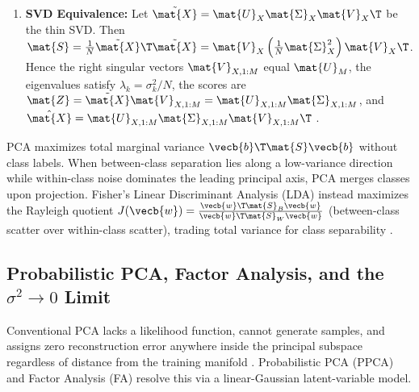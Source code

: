 \documentclass[../../../../master.tex]{subfiles}
\begin{document}
\begin{coremath}
\begin{enumerate}
  \item \textbf{SVD Equivalence:} Let $\tilde{\mat{X}} = \mat{U}_X \mat{\Sigma}_X \mat{V}_X\T$ be the thin SVD. Then $\mat{S} = \frac{1}{N}\tilde{\mat{X}}\T\tilde{\mat{X}} = \mat{V}_X \left(\frac{1}{N}\mat{\Sigma}_X^2\right) \mat{V}_X\T$. Hence the right singular vectors $\mat{V}_{X,1:M}$ equal $\mat{U}_M$, the eigenvalues satisfy $\lambda_k = \sigma_k^2 / N$, the scores are $\mat{Z} = \tilde{\mat{X}}\mat{V}_{X,1:M} = \mat{U}_{X,1:M}\mat{\Sigma}_{X,1:M}$, and $\hat{\mat{X}} = \mat{U}_{X,1:M}\mat{\Sigma}_{X,1:M}\mat{V}_{X,1:M}\T$ .
\end{enumerate}
\end{coremath}

\begin{intuition}
\label{rem:em:pca_vs_lda}
PCA maximizes total marginal variance $\vecb{b}\T\mat{S}\vecb{b}$ without class labels. When between-class separation lies along a low-variance direction while within-class noise dominates the leading principal axis, PCA merges classes upon projection. Fisher's Linear Discriminant Analysis (LDA) instead maximizes the Rayleigh quotient $J(\vecb{w}) = \frac{\vecb{w}\T \mat{S}_B \vecb{w}}{\vecb{w}\T \mat{S}_W \vecb{w}}$ (between-class scatter over within-class scatter), trading total variance for class separability .
\end{intuition}

\subsection{Probabilistic PCA, Factor Analysis, and the $\sigma^2 \to 0$ Limit}
\label{subsec:em:ppca}

Conventional PCA lacks a likelihood function, cannot generate samples, and assigns zero reconstruction error anywhere inside the principal subspace regardless of distance from the training manifold . Probabilistic PCA (PPCA) and Factor Analysis (FA) resolve this via a linear-Gaussian latent-variable model.
\end{document}
